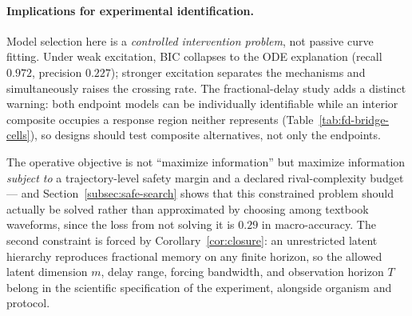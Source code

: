 \paragraph{Implications for experimental identification.}
Model selection here is a \emph{controlled intervention problem}, not passive curve fitting. Under weak excitation, BIC collapses to the ODE explanation (recall $0.972$, precision $0.227$); stronger excitation separates the mechanisms and simultaneously raises the crossing rate. The fractional-delay study adds a distinct warning: both endpoint models can be individually identifiable while an interior composite occupies a response region neither represents (Table~\ref{tab:fd-bridge-cells}), so designs should test composite alternatives, not only the endpoints.

The operative objective is not ``maximize information'' but maximize information \emph{subject to} a trajectory-level safety margin and a declared rival-complexity budget --- and Section~\ref{subsec:safe-search} shows that this constrained problem should actually be solved rather than approximated by choosing among textbook waveforms, since the loss from not solving it is $0.29$ in macro-accuracy. The second constraint is forced by Corollary~\ref{cor:closure}: an unrestricted latent hierarchy reproduces fractional memory on any finite horizon, so the allowed latent dimension $m$, delay range, forcing bandwidth, and observation horizon $T$ belong in the scientific specification of the experiment, alongside organism and protocol.
